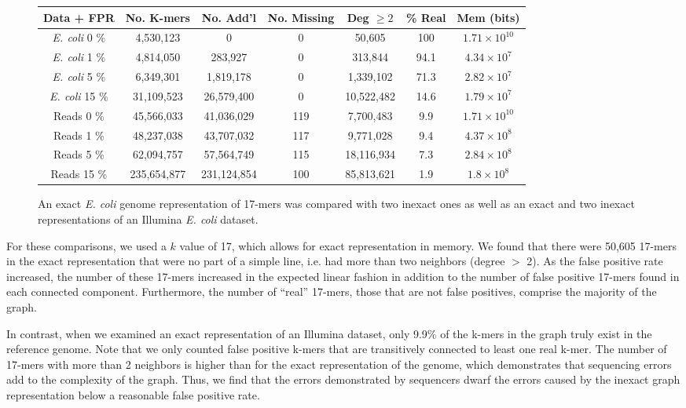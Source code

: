 \documentclass[12pt]{article} \usepackage{simplemargins}
\begin{document}
\begin{figure}
\begin{tabular}{ | c || c | c | c | c | c | c |}
\hline
Data + FPR & No. K-mers & No. Add'l & No. Missing & Deg $\ge 2$ & \% Real & Mem (bits) \\ \hline \hline
\emph{E. coli} 0 \% & 4,530,123 & 0 & 0 & 50,605 & 100 & $1.71 \times 10^{10}$ \\ \hline
\emph{E. coli} 1 \% & 4,814,050 & 283,927 & 0 & 313,844 & 94.1 & $4.34 \times 10^7$ \\ \hline
\emph{E. coli} 5 \% & 6,349,301 & 1,819,178 & 0 & 1,339,102 & 71.3 & $2.82 \times 10^7$ \\ \hline
\emph{E. coli} 15 \% & 31,109,523 & 26,579,400 & 0 & 10,522,482 & 14.6 & $1.79 \times 10^7$ \\ \hline
Reads 0 \% & 45,566,033 & 41,036,029 & 119 & 7,700,483 & 9.9 & $1.71 \times 10^{10}$ \\ \hline
Reads 1 \% & 48,237,038 & 43,707,032 & 117 & 9,771,028 & 9.4 & $4.37 \times 10^8$ \\ \hline
Reads 5 \% & 62,094,757 & 57,564,749 & 115 & 18,116,934 & 7.3 & $2.84 \times 10^8$ \\ \hline
Reads 15 \% & 235,654,877 & 231,124,854 & 100 & 85,813,621 & 1.9 & $1.8 \times 10^8$ \\
\hline
\end{tabular}
\caption{An exact \emph{E. coli} genome representation of 17-mers was compared with 
two inexact ones as well as an exact and two inexact representations of an Illumina 
\emph{E. coli} dataset.}
\end{figure}

For these comparisons, we used a $k$ value of 17, which allows for exact
representation in memory. We found 
that there were 50,605 17-mers in the exact representation that were no
part of a simple line, i.e. had more 
than two neighbors (degree $>$ 2). As the false positive rate 
increased, the number of these 
17-mers increased in the expected linear fashion in addition to the number of 
false positive 17-mers found in each connected component. Furthermore, the number of 
``real'' 17-mers, those that are not false positives, 
comprise the majority of the graph.

In contrast, when we examined an exact representation of an Illumina
dataset, only 9.9\% of the k-mers in the graph truly exist in the
reference genome. Note that we only counted false positive k-mers that
are transitively connected to least one real k-mer. The
number of 17-mers with more than 2 neighbors is higher
than for the exact representation of the genome, which demonstrates
that sequencing errors add to the complexity of the
graph. Thus, we find that the errors demonstrated by sequencers dwarf
the errors caused by the inexact graph representation below a
reasonable false positive rate.
\end{document}
